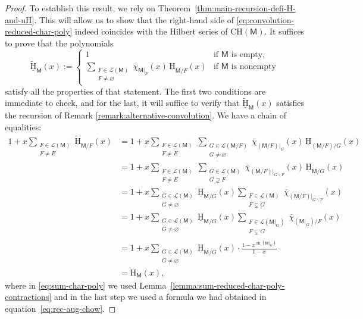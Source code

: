 \documentclass[11pt, a4paper, english]{amsart}
\theoremstyle{teoremas}
\theoremstyle{definition}
\DeclareMathOperator{\rk}{rk}
\newcommand{\M}{\mathsf{M}}
\renewcommand{\H}{\mathrm{H}}
\newcommand{\uH}{\underline{\mathrm{H}}}
\newcommand{\uCH}{\underline{\mathrm{CH}}}
\begin{document}
\begin{proof}
    To establish this result, we rely on Theorem~\ref{thm:main-recursion-defi-H-and-uH}. This will allow us to show that the right-hand side of \eqref{eq:convolution-reduced-char-poly} indeed coincides with the Hilbert series of $\uCH(\M)$. It suffices to prove that the polynomials
    \[ \widetilde{\uH}_{\M}(x) := 
    \begin{cases} 1 & \text{if $\M$ is empty,}\\ \displaystyle\sum_{\substack{F\in\mathcal{L}(\M)\\F\neq\varnothing}} \overline{\chi}_{\M|_F}(x) \, \uH_{\M/F}(x) & \text{if $\M$ is nonempty}
    \end{cases}\]
    satisfy all the properties of that statement. The first two conditions are immediate to check, and for the last, it will suffice to verify that $\widetilde{\uH}_{\M}(x)$ satisfies the recursion of Remark \ref{remark:alternative-convolution}. We have a chain of equalities:
    \begin{align}
        1 + x \sum_{\substack{F\in \mathcal{L}(\M)\\F\neq E}} \widetilde{\uH}_{\M/F}(x) 
        &=1+x\sum_{\substack{F\in \mathcal{L}(\M)\\F\neq E}} \sum_{\substack{G\in \mathcal{L}(\M/F)\\G\neq \varnothing}}  \overline{\chi}_{(\M/F)|_G}(x)\, \uH_{(\M/F)/G}(x) \nonumber\\
        &=1+x\sum_{\substack{F\in \mathcal{L}(\M)\\F\neq E}} \sum_{\substack{G\in \mathcal{L}(\M)\\G\supsetneq F}} \overline{\chi}_{(\M/F)|_{G\smallsetminus F}}(x)\, \uH_{\M/G}(x)\nonumber\\
        &= 1 +  x \sum_{\substack{G\in \mathcal{L}(\M)\\G\neq \varnothing}} \uH_{\M/G}(x) \sum_{\substack{F\in \mathcal{L}(\M)\\F\subsetneq G}} \overline{\chi}_{(\M/F)|_{G\smallsetminus F}}(x)\nonumber\\
        &=1 +  x \sum_{\substack{G\in \mathcal{L}(\M)\\G\neq \varnothing}} \uH_{\M/G}(x) \sum_{\substack{F\in \mathcal{L}(\M|_G)\\F\subsetneq G}} \overline{\chi}_{(\M|_G)/F}(x)\nonumber\\
        &= 1 +  x \sum_{\substack{G\in \mathcal{L}(\M)\\G\neq \varnothing}} \uH_{\M/G}(x) \cdot \frac{1-x^{\rk(\M|_G)}}{1-x} \label{eq:sum-char-poly}\\
        &= \H_{\M}(x),\nonumber
    \end{align}
    where in \eqref{eq:sum-char-poly} we used Lemma~\ref{lemma:sum-reduced-char-poly-contractions} and in the last step we used a formula we had obtained in equation~\eqref{eq:rec-aug-chow}.
\end{proof}
\end{document}
